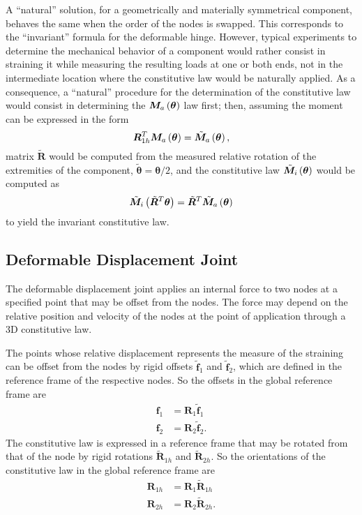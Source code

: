 \documentclass[10pt,dvips,fleqn,subeqn]{report}
\newcommand{\T}[1]{\bm{#1}}
\begin{document}
A ``natural'' solution, for a geometrically and materially symmetrical
component, behaves the same when the order of the nodes is swapped.
This corresponds to the ``invariant'' formula for the deformable hinge.
However, typical experiments to determine the mechanical behavior
of a component would rather consist in straining it while measuring
the resulting loads at one or both ends, not in the intermediate
location where the constitutive law would be naturally applied.
As a consequence, a ``natural'' procedure for the determination
of the constitutive law would consist in determining 
the $\T{M}_a\plbr{\T{\theta}}$ law first; 
then, assuming the moment can be expressed in the form
\begin{equation}
	\T{R}_{1h}^T \T{M}_a\plbr{\T{\theta}}
		= \tilde{\T{M}}_a\plbr{\T{\theta}} ,
\end{equation}
matrix $\tilde{\T{R}}$ would be computed
from the measured relative rotation of the extremities of the component,
$\tilde{\T{\theta}}=\T{\theta}/2$,
and the constitutive law $\tilde{\T{M}}_i\plbr{\T{\theta}}$ 
would be computed as
\begin{equation}
	\tilde{\T{M}}_i\plbr{\tilde{\T{R}}^T \T{\theta}}
		= \tilde{\T{R}}^T \tilde{\T{M}}_a\plbr{\T{\theta}}
\end{equation}
to yield the invariant constitutive law.




\subsection{Deformable Displacement Joint}
\label{sec:constraints:deformable:deformable displacement joint}
The deformable displacement joint applies an internal force to two nodes
at a specified point that may be offset from the nodes.
The force may depend on the relative position and velocity of the nodes
at the point of application through a 3D constitutive law.

The points whose relative displacement represents the measure 
of the straining can be offset from the nodes by rigid offsets
$\tilde{\T{f}}_1$ and $\tilde{\T{f}}_2$, which are defined
in the reference frame of the respective nodes.
So the offsets in the global reference frame are
\begin{subequations}
\begin{align}
	\T{f}_1 &= \T{R}_1 \tilde{\T{f}}_1 \\
	\T{f}_2 &= \T{R}_2 \tilde{\T{f}}_2 .
\end{align}
\end{subequations}
The constitutive law is expressed in a reference frame that may be rotated
from that of the node by rigid rotations $\tilde{\T{R}}_{1h}$
and $\tilde{\T{R}}_{2h}$.
So the orientations of the constitutive law in the global reference frame are
\begin{subequations}
\begin{align}
	\T{R}_{1h} &= \T{R}_1 \tilde{\T{R}}_{1h} \\
	\T{R}_{2h} &= \T{R}_2 \tilde{\T{R}}_{2h} .
\end{align}
\end{subequations}
\end{document}

